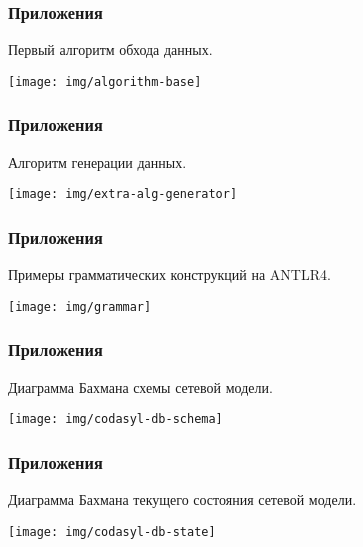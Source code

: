 \documentclass[pdf, hyperref={unicode}, aspectratio=169]{beamer}
\begin{document}
\begin{frame}
\frametitle{Приложения}
	Первый алгоритм обхода данных.

	\begin{center}
		\texttt{[image: img/algorithm-base]}
	\end{center}
\end{frame}


\begin{frame}
\frametitle{Приложения}
	Алгоритм генерации данных.

	\begin{center}
		\texttt{[image: img/extra-alg-generator]}
	\end{center}
\end{frame}


\begin{frame}
\frametitle{Приложения}
	Примеры грамматических конструкций на ANTLR4.

	\begin{center}
		\texttt{[image: img/grammar]}
	\end{center}
\end{frame}


\begin{frame}
\frametitle{Приложения}
	Диаграмма Бахмана схемы сетевой модели.

	\begin{center}
		\texttt{[image: img/codasyl-db-schema]}
	\end{center}
\end{frame}


\begin{frame}
\frametitle{Приложения}
	Диаграмма Бахмана текущего состояния сетевой модели.

	\begin{center}
		\texttt{[image: img/codasyl-db-state]}
	\end{center}
\end{frame}
\end{document}
